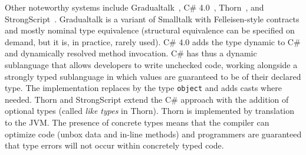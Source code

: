 \documentclass[runnningheads]{tex/llncs}
\begin{document}
Other noteworthy systems include Gradualtalk~\cite{GS13}, C\#
4.0~\cite{Bierman10}, Thorn~\cite{oopsla09}, and
StrongScript~\cite{ecoop15}. Gradualtalk is a variant of Smalltalk with
Felleisen-style contracts and mostly nominal type equivalence (structural
equivalence can be specified on demand, but it is, in practice, rarely
used). C\# 4.0 adds the type {\sf dynamic} to C\# and dynamically resolved
method invocation.  C\# has thus a dynamic sublanguage that allows
developers to write unchecked code, working alongside a strongly typed
sublanguage in which values are guaranteed to be of their declared type.
The implementation replaces \any by the type {\tt object} and adds casts
where needed.  Thorn and StrongScript extend the C\# approach with the
addition of optional types (called {\em like types} in Thorn).  Thorn is
implemented by translation to the JVM. The presence of concrete types means
that the compiler can optimize code (unbox data and in-line methods) and
programmers are guaranteed that type errors will not occur within concretely
typed code.

\newcommand{\rot}[1]{\rotatebox{80}{#1}}
\newcommand{\X}{\EM{\bullet}}
\newcommand{\XX}{\EM{\bullet^{(2)}}}
\newcommand{\XY}{\EM{\bullet^{(1)}}}
\end{document}
